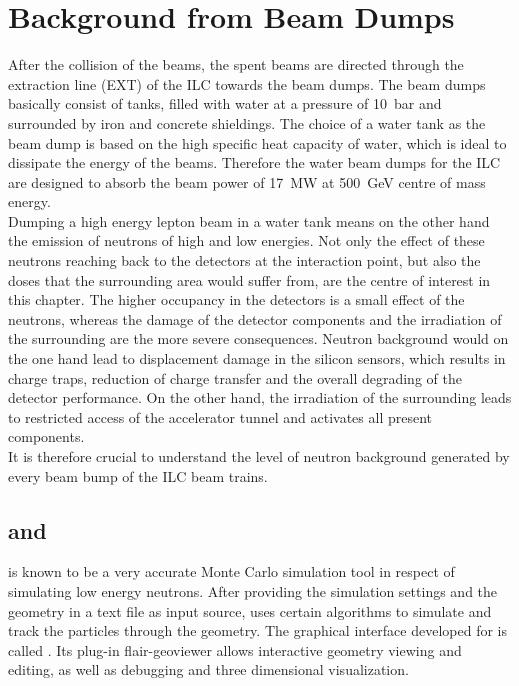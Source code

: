 \chapter{Background from Beam Dumps}
\label{BeamDumps}
After the collision of the \positron\electron beams, the spent beams are directed through the extraction line (EXT) of the ILC towards the beam dumps. The beam dumps basically consist of tanks, filled with water at a pressure of \SI{10}{\bar} and surrounded by iron and concrete shieldings. The choice of a water tank as the beam dump is based on the high specific heat capacity of water, which is ideal to dissipate the energy of the beams. Therefore the water beam dumps for the ILC are designed to absorb the beam power of \SI{17}{\mega\watt} at \SI{500}{\GeV} centre of mass energy.\\
Dumping a high energy lepton beam in a water tank means on the other hand the emission of neutrons of high and low energies. Not only the effect of these neutrons reaching back to the detectors at the interaction point, but also the doses that the surrounding area would suffer from, are the centre of interest in this chapter. The higher occupancy in the detectors is a small effect of the neutrons, whereas the damage of the detector components and the irradiation of the surrounding are the more severe consequences. Neutron background would on the one hand lead to displacement damage in the silicon sensors, which results in charge traps, reduction of charge transfer and the overall degrading of the detector performance. On the other hand, the irradiation of the surrounding leads to restricted access of the accelerator tunnel and activates all present components.\\It is therefore crucial to understand the level of neutron background generated by every beam bump of the ILC beam trains.

\section{\fluka and \flair}
\label{BeamDumps:fluka}
\fluka is known to be a very accurate Monte Carlo simulation tool in respect of simulating low energy neutrons. After providing the simulation settings and the geometry in a text file as input source, \fluka uses certain algorithms to simulate and track the particles through the geometry.
The graphical interface developed for \fluka is called \flair. Its plug-in flair-geoviewer allows interactive geometry viewing and editing, as well as debugging and three dimensional visualization.

